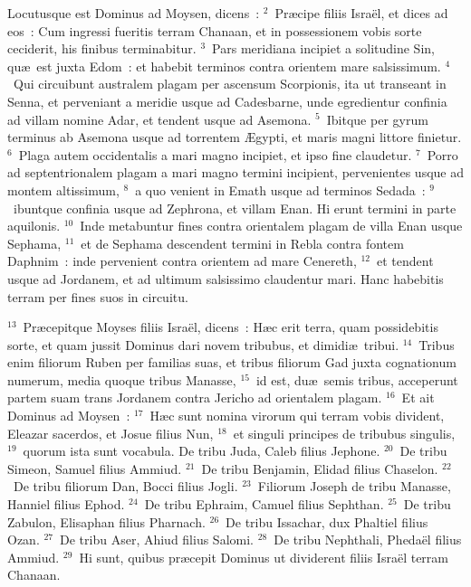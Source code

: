 \lettrine[lines=3,image=true,loversize=0.05,lraise=-0.03]{L}{}ocutusque est Dominus ad Moysen, dicens~:
${}^{2}$~Pr\ae cipe filiis Isra\"el, et dices ad eos~: Cum ingressi fueritis terram Chanaan, et in possessionem vobis sorte ceciderit, his finibus terminabitur.
${}^{3}$~Pars meridiana incipiet a solitudine Sin, qu\ae\ est juxta Edom~: et habebit terminos contra orientem mare salsissimum.
${}^{4}$~Qui circuibunt australem plagam per ascensum Scorpionis, ita ut transeant in Senna, et perveniant a meridie usque ad Cadesbarne, unde egredientur confinia ad villam nomine Adar, et tendent usque ad Asemona.
${}^{5}$~Ibitque per gyrum terminus ab Asemona usque ad torrentem \AE gypti, et maris magni littore finietur.
${}^{6}$~Plaga autem occidentalis a mari magno incipiet, et ipso fine claudetur.
${}^{7}$~Porro ad septentrionalem plagam a mari magno termini incipient, pervenientes usque ad montem altissimum,
${}^{8}$~a quo venient in Emath usque ad terminos Sedada~:
${}^{9}$~ibuntque confinia usque ad Zephrona, et villam Enan. Hi erunt termini in parte aquilonis.
${}^{10}$~Inde metabuntur fines contra orientalem plagam de villa Enan usque Sephama,
${}^{11}$~et de Sephama descendent termini in Rebla contra fontem Daphnim~: inde pervenient contra orientem ad mare Cenereth,
${}^{12}$~et tendent usque ad Jordanem, et ad ultimum salsissimo claudentur mari. Hanc habebitis terram per fines suos in circuitu.


${}^{13}$~Pr\ae cepitque Moyses filiis Isra\"el, dicens~: H\ae c erit terra, quam possidebitis sorte, et quam jussit Dominus dari novem tribubus, et dimidi\ae\ tribui.
${}^{14}$~Tribus enim filiorum Ruben per familias suas, et tribus filiorum Gad juxta cognationum numerum, media quoque tribus Manasse,
${}^{15}$~id est, du\ae\ semis tribus, acceperunt partem suam trans Jordanem contra Jericho ad orientalem plagam.
${}^{16}$~Et ait Dominus ad Moysen~:
${}^{17}$~H\ae c sunt nomina virorum qui terram vobis divident, Eleazar sacerdos, et Josue filius Nun,
${}^{18}$~et singuli principes de tribubus singulis,
${}^{19}$~quorum ista sunt vocabula. De tribu Juda, Caleb filius Jephone.
${}^{20}$~De tribu Simeon, Samuel filius Ammiud.
${}^{21}$~De tribu Benjamin, Elidad filius Chaselon.
${}^{22}$~De tribu filiorum Dan, Bocci filius Jogli.
${}^{23}$~Filiorum Joseph de tribu Manasse, Hanniel filius Ephod.
${}^{24}$~De tribu Ephraim, Camuel filius Sephthan.
${}^{25}$~De tribu Zabulon, Elisaphan filius Pharnach.
${}^{26}$~De tribu Issachar, dux Phaltiel filius Ozan.
${}^{27}$~De tribu Aser, Ahiud filius Salomi.
${}^{28}$~De tribu Nephthali, Pheda\"el filius Ammiud.
${}^{29}$~Hi sunt, quibus pr\ae cepit Dominus ut dividerent filiis Isra\"el terram Chanaan.

